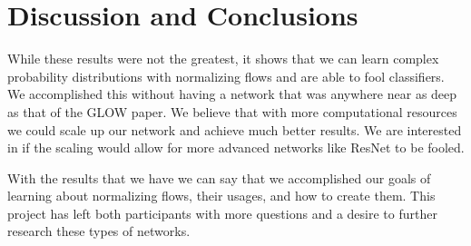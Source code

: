 \section{Discussion and Conclusions}
While these results were not the greatest, it shows that we can learn complex
probability distributions with normalizing flows and are able to fool
classifiers. We accomplished this without having a network that was anywhere
near as deep as that of the GLOW paper. We believe that with more computational
resources we could scale up our network and achieve much better results. We are
interested in if the scaling would allow for more advanced networks like ResNet
to be fooled. 

With the results that we have we can say that we accomplished our goals of
learning about normalizing flows, their usages, and how to create them. This
project has left both participants with more questions and a desire to further
research these types of networks. 
